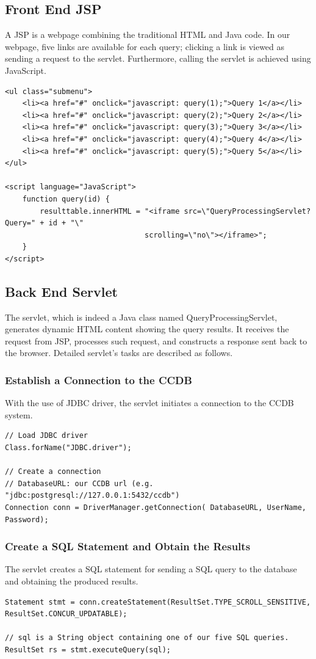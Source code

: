 \documentclass[11pt]{article}
\begin{document}
\subsection{Front End JSP}
A JSP is a webpage combining the traditional HTML and Java code. In our webpage, five links are available for each query; clicking a link is viewed as sending a request to the servlet. Furthermore, calling the servlet is achieved using JavaScript.
\begin{verbatim}
<ul class="submenu">
    <li><a href="#" onclick="javascript: query(1);">Query 1</a></li>
    <li><a href="#" onclick="javascript: query(2);">Query 2</a></li>
    <li><a href="#" onclick="javascript: query(3);">Query 3</a></li>
    <li><a href="#" onclick="javascript: query(4);">Query 4</a></li>
    <li><a href="#" onclick="javascript: query(5);">Query 5</a></li>
</ul>

<script language="JavaScript">
    function query(id) {
        resulttable.innerHTML = "<iframe src=\"QueryProcessingServlet?Query=" + id + "\"
                                scrolling=\"no\"></iframe>";
    }
</script>
\end{verbatim}

\subsection{Back End Servlet}
The servlet, which is indeed a Java class named QueryProcessingServlet, generates dynamic HTML content showing the query results. It receives the request from JSP, processes such request, and constructs a response sent back to the browser. Detailed servlet's tasks are described as follows.

\subsubsection{Establish a Connection to the CCDB}
With the use of JDBC driver, the servlet initiates a connection to the CCDB system.
\begin{verbatim}
// Load JDBC driver
Class.forName("JDBC.driver");

// Create a connection
// DatabaseURL: our CCDB url (e.g. "jdbc:postgresql://127.0.0.1:5432/ccdb")
Connection conn = DriverManager.getConnection( DatabaseURL, UserName, Password);
\end{verbatim}

\subsubsection{Create a SQL Statement and Obtain the Results}
The servlet creates a SQL statement for sending a SQL query to the database and obtaining the produced results.
\begin{verbatim}
Statement stmt = conn.createStatement(ResultSet.TYPE_SCROLL_SENSITIVE, ResultSet.CONCUR_UPDATABLE);

// sql is a String object containing one of our five SQL queries.
ResultSet rs = stmt.executeQuery(sql);
\end{verbatim}
\end{document}
